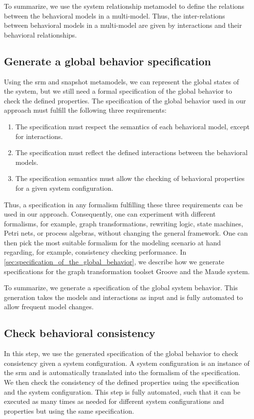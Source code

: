 \documentclass{jot}
\begin{document}
To summarize, we use the system relationship metamodel to define the relations between the behavioral models in a multi-model.
Thus, the inter-relations between behavioral models in a multi-model are given by interactions and their behavioral relationships.


\subsection{Generate a global behavior specification}
Using the \gls*{srm} and snapshot metamodels, we can represent the global states of the system, but we still need a formal specification of the global behavior to check the defined properties.
The specification of the global behavior used in our approach must fulfill the following three requirements:
\begin{enumerate}
    \item The specification must respect the semantics of each behavioral model, except for interactions.
    \item The specification must reflect the defined interactions between the behavioral models.
    \item The specification semantics must allow the checking of behavioral properties for a given system configuration.
\end{enumerate}
Thus, a specification in any formalism fulfilling these three requirements can be used in our approach.
Consequently, one can experiment with different formalisms, for example, graph transformations, rewriting logic, state machines, Petri nets, or process algebras, without changing the general framework.
One can then pick the most suitable formalism for the modeling scenario at hand regarding, for example, consistency checking performance.
In \cref{sec:specification_of_the_global_behavior}, we describe how we generate specifications for the graph transformation toolset Groove and the Maude system.

To summarize, we generate a specification of the global system behavior.
This generation takes the models and interactions as input and is fully automated to allow frequent model changes.


\subsection{Check behavioral consistency}
In this step, we use the generated specification of the global behavior to check consistency given a system configuration.
A system configuration is an instance of the \gls*{srm} and is automatically translated into the formalism of the specification.
We then check the consistency of the defined properties using the specification and the system configuration.
This step is fully automated, such that it can be executed as many times as needed for different system configurations and properties but using the same specification.
\end{document}
